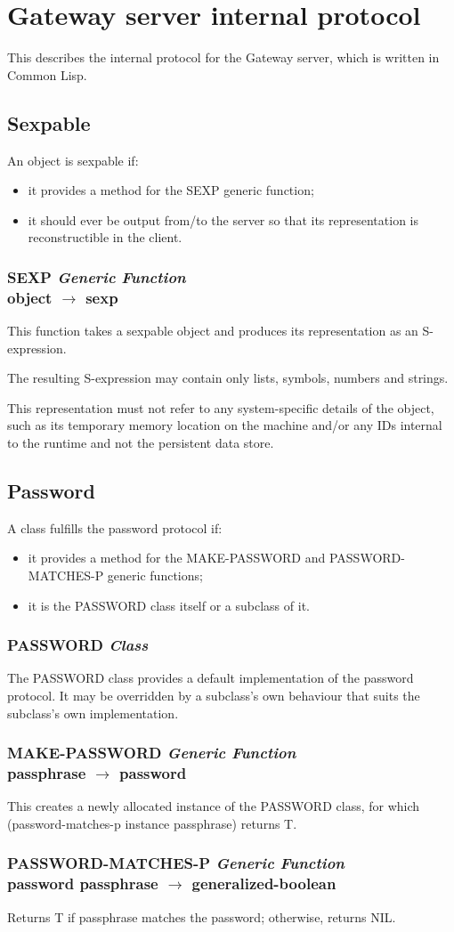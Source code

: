 \documentclass[10pt]{extarticle}
\newcommand{\genericentry}[4] {\setstretch{0.7}
                               \vspace{-0.5em} \subsubsection{{\btt #1} \hfill {\it #2} \\
                               {\vspace{0.0em} \hspace{0.2cm} \scriptsize \ttfamily #3 $\rightarrow$ #4}}
                               \setstretch{1.0}}
\newcommand{\classentry}[2] {\subsubsection{{\btt #1} \hfill {\it #2}}}
\begin{document}
\section{Gateway server internal protocol}
This describes the internal protocol for the Gateway server, which is written in Common Lisp.



\subsection{Sexpable}
An object is sexpable if:
\begin{itemize}[noitemsep]
\item it provides a method for the {\btt SEXP} generic function;
\item it should ever be output from/to the server so that its representation is reconstructible in the client.
\end{itemize}
\genericentry{SEXP}{Generic Function}{object}{sexp}
This function takes a sexpable object and produces its representation as an S-expression. \par
The resulting S-expression may contain only lists, symbols, numbers and strings. \par
This representation must not refer to any system-specific details of the object, such as its temporary memory location on the machine and/or any IDs internal to the runtime and not the persistent data store.




\subsection{Password}
A class fulfills the password protocol if:
\begin{itemize}[noitemsep]
\item it provides a method for the {\btt MAKE-PASSWORD} and {\btt PASSWORD-MATCHES-P} generic functions;
\item it is the {\btt PASSWORD} class itself or a subclass of it.
\end{itemize}
\classentry{PASSWORD}{Class}
The PASSWORD class provides a default implementation of the password protocol. It may be overridden by a subclass's own behaviour that suits the subclass's own implementation.
\genericentry{MAKE-PASSWORD}{Generic Function}{passphrase}{password}
This creates a newly allocated instance of the {\btt PASSWORD} class, for which {\btt(password-matches-p instance passphrase)} returns {\btt T}.
\genericentry{PASSWORD-MATCHES-P}{Generic Function}{password passphrase}{generalized-boolean}
Returns {\btt T} if {\btt passphrase} matches the {\btt password}; otherwise, returns {\btt NIL}.
\end{document}
